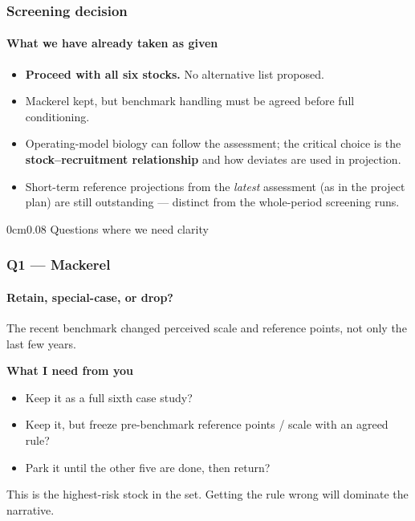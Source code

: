 \documentclass[
  aspectratio=169,
  t,
  onlytextwidth,
  10pt,
]{beamer}
\begin{document}
\begin{frame}
  \frametitle{Screening decision}
  \framesubtitle{What we have already taken as given}

  \begin{itemize}
    \item \textbf{Proceed with all six stocks.} No alternative list proposed.
    \item Mackerel kept, but benchmark handling must be agreed before full conditioning.
    \item Operating-model biology can follow the assessment; the critical choice is the \textbf{stock--recruitment relationship} and how deviates are used in projection.
    \item Short-term reference projections from the \emph{latest} assessment (as in the project plan) are still outstanding --- distinct from the whole-period screening runs.
  \end{itemize}
\end{frame}

\begingroup
  \begin{frame}
    \begin{adjustwidth}{0cm}{0.08\textwidth}
      {\Huge\ImperialSansSemiBold Questions where we need clarity}
    \end{adjustwidth}
  \end{frame}
\endgroup

\begin{frame}
  \frametitle{Q1 --- Mackerel}
  \framesubtitle{Retain, special-case, or drop?}

  {\large The recent benchmark changed perceived scale and reference points, not only the last few years.}

  \vspace{0.6em}
  \textbf{What I need from you}
  \begin{itemize}
    \item Keep it as a full sixth case study?
    \item Keep it, but freeze pre-benchmark reference points / scale with an agreed rule?
    \item Park it until the other five are done, then return?
  \end{itemize}

  \vspace{0.4em}
  {\small This is the highest-risk stock in the set. Getting the rule wrong will dominate the narrative.}
\end{frame}
\end{document}

